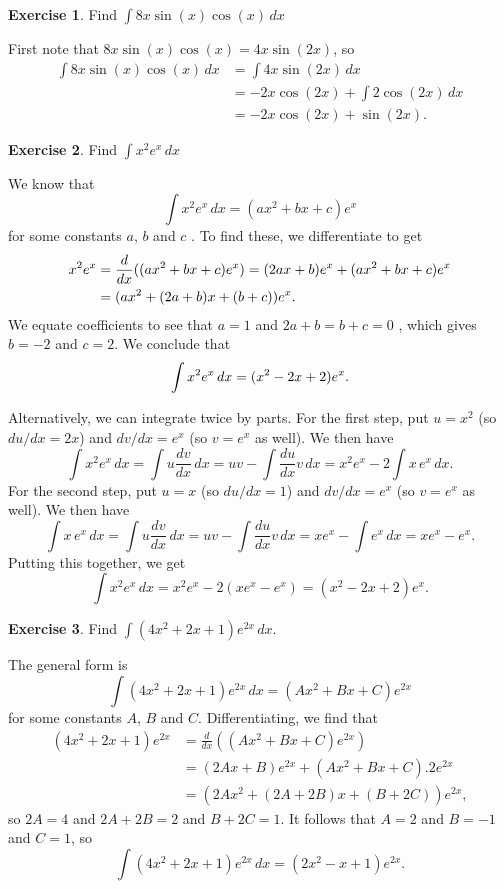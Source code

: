 \documentclass[a4paper]{amsart}
\theoremstyle{definition}
\newtheorem{exercise}{Exercise}[section]
\newenvironment{solution}{{\noindent \bf Solution:}}{}
\begin{document}
\begin{exercise}\label{ex-int-poly-trig}
Find $\int 8x\sin(x)\cos(x)\,dx$
\end{exercise}
\begin{solution}
  First note that $8x\sin(x)\cos(x)=4x\sin(2x)$, so 
  \begin{align*}
   \int 8x\sin(x)\cos(x)\,dx &= 
    \int 4x\sin(2x)\,dx \\
    &= -2x\cos(2x) + \int 2\cos(2x)\, dx \\
    &= -2x\cos(2x) + \sin(2x).
  \end{align*}
\end{solution}
\begin{exercise}\label{ex-int-poly-exp-i}
Find $\int x^2 e^x\, dx$
\end{exercise}
\begin{solution}
  We know that
  \[ \int x^2 e^x\, dx = (ax^2+bx+c) e^x \]
  for some constants $a$, $b$ and $c$ .  To find these, we
  differentiate to get 
  \begin{align*}
   x^2 e^x &= \frac{d}{dx}((ax^2+bx+c) e^x) 
    = (2ax+b)e^x + (ax^2+bx+c) e^x  \\
    &= (ax^2+(2a+b)x+(b+c))e^x.
  \end{align*}
  We equate coefficients to see that $a=1$ and $2a+b=b+c=0$ \mk, which
  gives $b=-2$ and $c=2$.  We conclude that
  \[ \int x^2 e^x\, dx = (x^2-2x+2) e^x.  \]

  Alternatively, we can integrate twice by parts.  For the first step,
  put $u=x^2$ (so $du/dx=2x$) and $dv/dx=e^x$ (so $v=e^x$ as well).
  We then have
  \[ \int x^2e^x\,dx = \int u\frac{dv}{dx}\,dx = 
      uv - \int \frac{du}{dx} v\,dx = 
      x^2e^x - 2\int x\,e^x\,dx.
  \]
  For the second step, put $u=x$ (so $du/dx=1$) and $dv/dx=e^x$ (so
  $v=e^x$ as well).  We then have
  \[ \int x\,e^x\,dx = \int u\frac{dv}{dx}\,dx = 
      uv - \int \frac{du}{dx} v\,dx = 
      x e^x - \int e^x\,dx = x e^x - e^x.
  \]
  Putting this together, we get
  \[ \int x^2e^x\,dx = x^2e^x - 2(xe^x - e^x) = (x^2-2x+2)e^x. \]
\end{solution}
\begin{exercise}\label{ex-int-poly-exp-ii}
Find $\int (4x^2+2x+1)e^{2x}\,dx$.
\end{exercise}
\begin{solution}
  The general form is
  \[ \int (4x^2+2x+1)e^{2x}\,dx = (Ax^2+Bx+C)e^{2x} \]
  for some constants $A$, $B$ and $C$.  Differentiating, we find that 
  \begin{align*}
   (4x^2+2x+1)e^{2x} &= \frac{d}{dx}((Ax^2+Bx+C)e^{2x}) \\
     &= (2Ax+B)e^{2x} + (Ax^2+Bx+C).2e^{2x} \\
     &= (2Ax^2+(2A+2B)x+(B+2C))e^{2x},
  \end{align*}
  so $2A=4$ and $2A+2B=2$ and $B+2C=1$.  It follows that $A=2$ and
  $B=-1$ and $C=1$, so
  \[  \int (4x^2+2x+1)e^{2x}\,dx = (2x^2-x+1)e^{2x}. \]
\end{solution}
\end{document}

